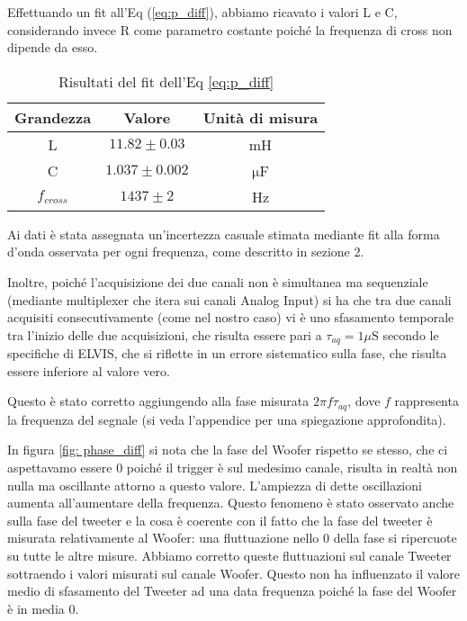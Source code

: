 \documentclass[../Relazione_circuiti]{subfiles}
\begin{document}
  
Effettuando un fit all'Eq (\ref{eq:p_diff}), abbiamo ricavato i valori L e C, considerando invece R come parametro costante poiché la frequenza di cross non dipende da esso.


\begin{table}[H]
\centering

\begin{tabular}{c | c | c}
Grandezza & Valore & Unità di misura \\
\hline
L & $ 11.82 \pm 0.03 $ & mH \\
C & $ 1.037 \pm 0.002 $ & $\mathrm{\mu}$F \\
$f_{cross}$ & $ 1437 \pm 2$ & Hz

\end{tabular}
\caption{Risultati del fit dell'Eq \ref{eq:p_diff}}
\label{tab: fit_phase}

\end{table}
Ai dati è stata assegnata un'incertezza casuale stimata mediante fit alla forma d'onda osservata per ogni frequenza, come descritto in sezione 2. 

Inoltre, poiché l'acquisizione dei due canali non è simultanea ma sequenziale (mediante multiplexer che itera sui canali Analog Input) si ha che tra due canali acquisiti consecutivamente (come nel nostro caso) vi è uno sfasamento temporale tra l'inizio delle due acquisizioni, che risulta essere pari a $\tau_{aq}=1 \mu \mathrm{S}$ secondo le specifiche di ELVIS, che si riflette in un errore sistematico sulla fase, che risulta essere inferiore al valore vero.

Questo è stato corretto aggiungendo alla fase misurata  $ 2 \pi f \tau_{aq}$, dove $f$ rappresenta la frequenza del segnale (si veda l'appendice per una spiegazione approfondita).

In figura \ref{fig: phase_diff} si nota che la fase del Woofer rispetto se stesso, che ci aspettavamo essere 0 poiché il trigger è sul medesimo canale, risulta in realtà non nulla ma oscillante attorno a questo valore. L'ampiezza di dette oscillazioni aumenta all'aumentare della frequenza. Questo fenomeno è stato osservato anche sulla fase del tweeter e la cosa è coerente con il fatto che la fase del tweeter è misurata relativamente al Woofer: una fluttuazione nello 0 della fase si ripercuote su tutte le altre misure. Abbiamo corretto queste fluttuazioni sul canale Tweeter sottraendo i valori misurati sul canale Woofer. Questo non ha influenzato il valore medio di sfasamento del Tweeter ad una data frequenza poiché la fase del Woofer è in media 0.
\end{document}
